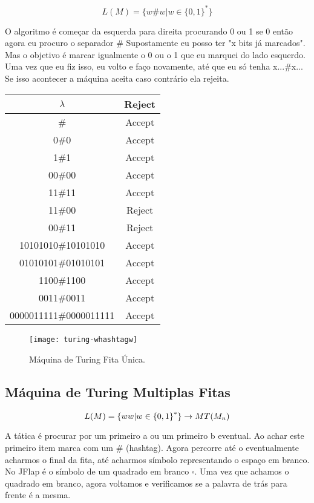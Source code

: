 \documentclass[12pt, a4paper]{article}
\begin{document}
$$ L(M)= \lbrace w \# w \vert w \in  {\lbrace 0,1 \rbrace}^* \rbrace $$

\qquad O algoritmo é começar da esquerda para direita procurando 0 ou 1 se 0 então agora eu procuro o separador \# Supostamente eu posso ter "x bits já marcados". Mas o objetivo é marcar igualmente o 0 ou o 1 que eu marquei do lado esquerdo. Uma vez que eu fiz isso, eu volto e faço novamente, até que eu só tenha x...\#x... Se isso acontecer a máquina aceita caso contrário ela rejeita.


\begin{tabular}{|c|c|}
  \hline $\lambda$              & Reject \\
  \hline \#                     & Accept \\
  \hline 0\#0                   & Accept \\
  \hline 1\#1                   & Accept \\
  \hline 00\#00                 & Accept \\
  \hline 11\#11                 & Accept \\
  \hline 11\#00                 & Reject \\
  \hline 00\#11                 & Reject \\
  \hline 10101010\#10101010     & Accept \\
  \hline 01010101\#01010101     & Accept \\
  \hline 1100\#1100             & Accept \\
  \hline 0011\#0011             & Accept \\
  \hline 0000011111\#0000011111 & Accept \\
  \hline
\end{tabular}

\begin{figure}[ht]
\centering
\texttt{[image: turing-whashtagw]}
\caption{Máquina de Turing Fita Única.}
\end{figure}

\pagebreak
\subsection{Máquina de Turing Multiplas Fitas}

$$ L(M)= \lbrace ww \vert w \in  {\lbrace 0,1 \rbrace}^* \rbrace \rightarrow MT \small (M_{n}) $$

\qquad A tática é procurar por um primeiro a ou um primeiro b eventual. Ao achar este primeiro item marca com um \# (hashtag). Agora percorre até o eventualmente acharmos o final da fita, até acharmos símbolo representando o espaço em branco. No JFlap é o símbolo de um quadrado em branco $\square$. Uma vez que achamos o quadrado em branco, agora voltamos e verificamos se a palavra de trás para frente é a mesma.
\end{document}
